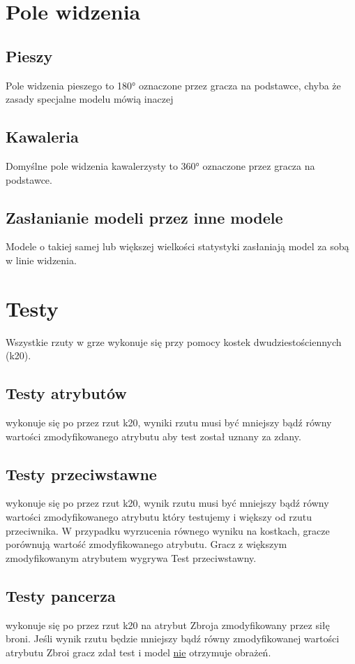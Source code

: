 \section{Pole widzenia}

\subsection{Pieszy}
Pole widzenia pieszego to \ang{180} oznaczone przez gracza na podstawce, chyba że zasady specjalne modelu mówią inaczej

\subsection{Kawaleria}
Domyślne pole widzenia kawalerzysty to \ang{360} oznaczone przez gracza na podstawce. 

\subsection{Zasłanianie modeli przez inne modele}
Modele o takiej samej lub większej wielkości statystyki zasłaniają model za sobą w linie widzenia. 

\section{Testy}

Wszystkie rzuty w grze wykonuje się przy pomocy kostek dwudziestościennych (k20).

\subsection{Testy atrybutów} wykonuje się po przez rzut k20, wyniki rzutu musi być mniejszy bądź równy wartości zmodyfikowanego atrybutu aby test został uznany za zdany. 

\subsection{Testy przeciwstawne} wykonuje się po przez rzut k20, wynik rzutu musi być mniejszy bądź równy wartości zmodyfikowanego atrybutu który testujemy i większy od rzutu przeciwnika. W przypadku wyrzucenia równego wyniku na kostkach, gracze porównują wartość zmodyfikowanego atrybutu. Gracz z większym zmodyfikowanym atrybutem wygrywa Test przeciwstawny. 
\subsection{Testy pancerza} wykonuje się po przez rzut k20 na atrybut Zbroja zmodyfikowany przez siłę broni. Jeśli wynik rzutu będzie mniejszy bądź równy zmodyfikowanej wartości atrybutu Zbroi gracz zdał test i model \underline{nie} otrzymuje obrażeń.


